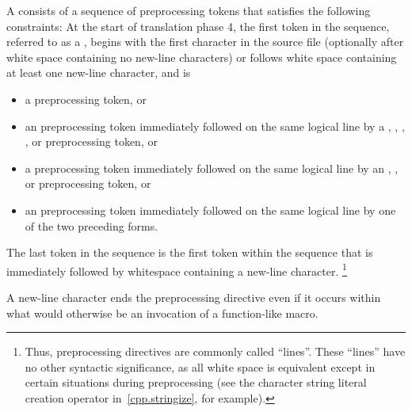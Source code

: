 \begin{bnf}
\br
\end{bnf}

\pnum
A  consists of a sequence of preprocessing tokens
that satisfies the following constraints:
At the start of translation phase 4,
the first token in the sequence,
referred to as a ,
begins with the first character in the source file
(optionally after white space containing no new-line characters) or
follows white space containing at least one new-line character,
and is

\begin{itemize}
\item
a \tcode{\#} preprocessing token, or

\item
an  preprocessing token
immediately followed on the same logical line by a
,
\tcode{<},
,
, or
\tcode{:}
preprocessing token, or

\item
a  preprocessing token
immediately followed on the same logical line by an
,
\tcode{:}, or
\tcode{;}
preprocessing token, or

\item
an  preprocessing token
immediately followed on the same logical line by
one of the two preceding forms.
\end{itemize}

The last token in the sequence is the first token within the sequence that
is immediately followed by whitespace containing a new-line character.%
\footnote{Thus,
preprocessing directives are commonly called ``lines''.
These ``lines'' have no other syntactic significance,
as all white space is equivalent except in certain situations
during preprocessing (see the
\tcode{\#}
character string literal creation operator in~\ref{cpp.stringize}, for example).}
\begin{note}
A new-line character ends the preprocessing directive even if it occurs
within what would otherwise be an invocation of a function-like macro.
\end{note}

